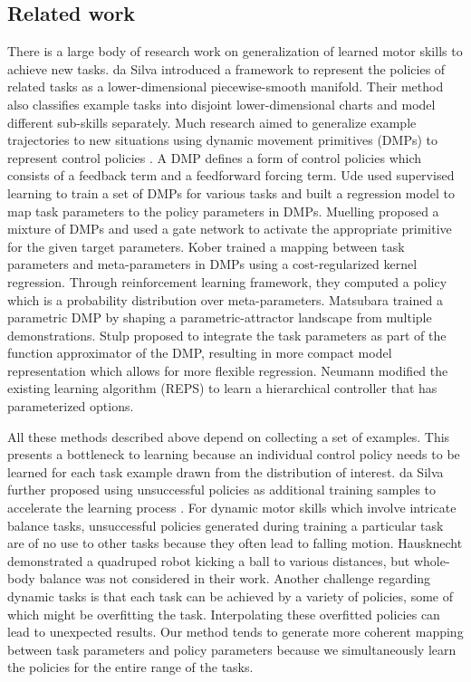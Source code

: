 \subsection{Related work}

There is a large body of research work on generalization of learned
motor skills to achieve new tasks. da Silva \etal
\cite{DaSilva:2012:LPS,DaSilva:2014:LPM,DaSilva:2014:ACP} introduced a
framework to represent the policies of related tasks as a
lower-dimensional piecewise-smooth manifold. Their method also
classifies example tasks into disjoint lower-dimensional charts and
model different sub-skills separately. Much research aimed to
generalize example trajectories to new situations using dynamic
movement primitives (DMPs) to represent control policies
\cite{Ijspeert:2002:LAL}. A DMP defines a form of control policies
which consists of a feedback term and a feedforward forcing
term. Ude \etal \cite{Ude:2010:TSG} used supervised learning to train a set of
DMPs for various tasks and built a regression model to map task
parameters to the policy parameters in DMPs. Muelling \etal \cite{Muelling:2010:LTT}
proposed a mixture of DMPs and used a gate network to activate the
appropriate primitive for the given target parameters.
Kober\etal \cite{Kober:2010:RLA} trained a mapping between task parameters and
meta-parameters in DMPs using a cost-regularized kernel
regression. Through reinforcement learning framework, they computed a
policy which is a probability distribution over meta-parameters.
Matsubara \etal \cite{Matsubara:2011:LPD} trained a parametric DMP by shaping a
parametric-attractor landscape from multiple demonstrations.
Stulp \etal \cite{Stulp:2013:LCP} proposed to integrate the task parameters as
part of the function approximator of the DMP, resulting in more
compact model representation which allows for more flexible
regression. Neumann \etal \cite{Neumann:2013:IMS} modified the existing learning
algorithm (REPS) to learn a hierarchical controller that has
parameterized options.

All these methods described above depend on collecting a set of
examples. This presents a bottleneck to learning because an individual
control policy needs to be learned for each task example drawn from
the distribution of interest. da Silva \etal further proposed using
unsuccessful policies as additional training samples to accelerate the
learning process \cite{DaSilva:2014:LPM}. For dynamic motor skills
which involve intricate balance tasks, unsuccessful policies generated
during training a particular task are of no use to other tasks because
they often lead to falling motion. Hausknecht \etal \cite{Hausknecht:2010:LPK}
demonstrated a quadruped robot kicking a ball to various distances,
but whole-body balance was not considered in their work.  Another
challenge regarding dynamic tasks is that each task can be achieved by
a variety of policies, some of which might be overfitting the
task. Interpolating these overfitted policies can lead to unexpected
results. Our method tends to generate more coherent mapping between
task parameters and policy parameters because we simultaneously learn
the policies for the entire range of the tasks.

